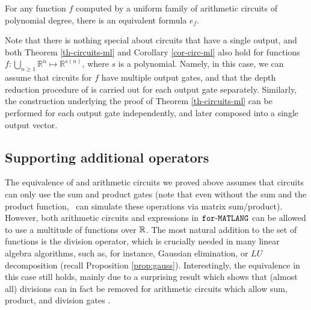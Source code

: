 \begin{corollary}
\label{cor-circ-ml}
For any function $f$ computed by a uniform family of arithmetic circuits of polynomial degree, there is an equivalent \langfor formula $e_f$.
\end{corollary}

Note that there is nothing special about circuits that have a single output, and both Theorem \ref{th-circuits-ml} and Corollary \ref{cor-circ-ml} also hold for functions  $f:\bigcup_{n\geq 1} \mathbb{R}^n\mapsto\mathbb{R}^{s(n)}$, where $s$ is a polynomial. Namely, in this case, we can assume that circuits for $f$ have multiple output gates, and that the depth reduction procedure of \cite{AllenderJMV98} is carried out for each output gate separately. Similarly, the construction underlying the proof of Theorem \ref{th-circuits-ml} can be performed for each output gate independently, and later composed into a single output vector.

\subsection{Supporting additional operators}\label{subsec:additionalop}
The equivalence of \langfor and arithmetic circuits we proved above assumes that circuits can only use the sum and product gates (note that even without the sum and the product function, \langfor\ can simulate these operations via matrix sum/product). However, both arithmetic circuits and expressions in $\texttt{for}\text{-}\texttt{MATLANG}$ can be allowed to use a multitude of functions over $\mathbb{R}$. The most natural addition to the set of functions is the division operator, which is crucially needed in many linear algebra algorithms, such as, for instance, Gaussian elimination, or $LU$ decomposition (recall Proposition \ref{prop:gauss}).
Interestingly, the equivalence in this case still holds, mainly due to a surprising result which shows that (almost all) divisions can in fact be removed for arithmetic circuits which allow sum, product, and division gates \cite{allender}.

